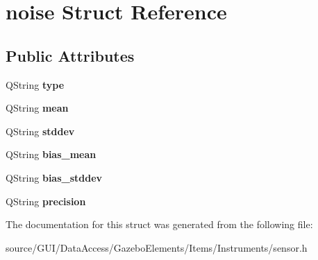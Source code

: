 \section{noise Struct Reference}
\label{structnoise}
\subsection*{Public Attributes}
\begin{DoxyCompactItemize}
\item 
Q\+String {\bfseries type}\label{structnoise_abcb322c69eb22402dfec03ed0edb54e9}

\item 
Q\+String {\bfseries mean}\label{structnoise_a64d7afbabf614e67c22a893cb43c3e6f}

\item 
Q\+String {\bfseries stddev}\label{structnoise_a84b6de0cd75d66a879dc1e91c9c29a10}

\item 
Q\+String {\bfseries bias\+\_\+mean}\label{structnoise_a79a7b4d2d2d8381ca99c2d56695357ce}

\item 
Q\+String {\bfseries bias\+\_\+stddev}\label{structnoise_ad8d8c5d0037329d11244fbf10483f13a}

\item 
Q\+String {\bfseries precision}\label{structnoise_a7b862cf8d7be0be8fdbe28c615ff3ef1}

\end{DoxyCompactItemize}


The documentation for this struct was generated from the following file\+:\begin{DoxyCompactItemize}
\item 
source/\+G\+U\+I/\+Data\+Access/\+Gazebo\+Elements/\+Items/\+Instruments/sensor.\+h\end{DoxyCompactItemize}
